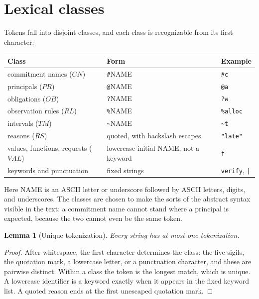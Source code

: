 \documentclass[11pt,openany]{book}
\newtheorem{lemma}[theorem]{Lemma}
\theoremstyle{remark}
\begin{document}
\section{Lexical classes}

Tokens fall into disjoint classes, and each class is recognizable from its
first character:
\begin{center}
\small
\begin{tabular}{lll}
\toprule
Class & Form & Example\\
\midrule
commitment names ($\mathit{CN}$) & \texttt{\#}NAME & \texttt{\#c}\\
principals ($\mathit{PR}$) & \texttt{@}NAME & \texttt{@a}\\
obligations ($\mathit{OB}$) & \texttt{?}NAME & \texttt{?w}\\
observation rules ($\mathit{RL}$) & \texttt{\%}NAME & \texttt{\%alloc}\\
intervals ($\mathit{TM}$) & \texttt{\textasciitilde}NAME & \texttt{\textasciitilde t}\\
reasons ($\mathit{RS}$) & quoted, with backslash escapes & \texttt{"late"}\\
values, functions, requests ($\mathit{VAL}$) & lowercase-initial NAME, not a keyword & \texttt{f}\\
keywords and punctuation & fixed strings & \texttt{verify}, \texttt{|}\\
\bottomrule
\end{tabular}
\end{center}
Here NAME is an ASCII letter or underscore followed by ASCII letters,
digits, and underscores. The classes are chosen to make the sorts of the
abstract syntax visible in the text: a commitment name cannot stand where
a principal is expected, because the two cannot even be the same token.

\begin{lemma}[Unique tokenization]\label{lem:lex}
Every string has at most one tokenization.
\end{lemma}

\begin{proof}
After whitespace, the first character determines the class: the five
sigils, the quotation mark, a lowercase letter, or a punctuation
character, and these are pairwise distinct. Within a class the token is
the longest match, which is unique. A lowercase identifier is a keyword
exactly when it appears in the fixed keyword list. A quoted reason ends at
the first unescaped quotation mark.
\end{proof}
\end{document}
